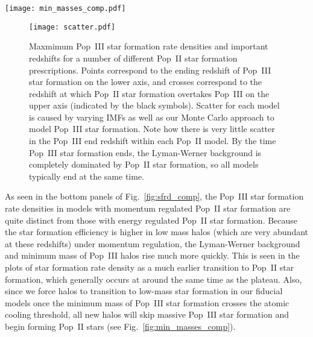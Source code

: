 \documentclass[a4paper,fleqn,usenatbib]{mnras}
\begin{document}
\begin{figure*}
	\texttt{[image: min\_masses\_comp.pdf]}
    \caption{Minimum mass for Pop~III star formation for a variety of our models. The atomic cooling threshold is shown as the dashed line. The top panel shows our results for the low mass Pop~III IMF under a variety of different assumptions for the Pop~II and III star formation prescriptions. The bottom panels compare our results for different Pop~III IMFs using the energy- and momentum- regulated Pop~II star formation prescriptions. Once the minimum mass crosses the atomic cooling threshold, any new halos will begin forming low-mass stars, even if they form out of primordial gas. This is why the Pop~III star formation rate density vanishes so quickly in the momentum regulated models.}
    \label{fig:min_masses_comp}
\end{figure*}

\begin{figure}
	\texttt{[image: scatter.pdf]}
    \caption{Maxmimum Pop~III star formation rate densities and important redshifts for a number of different Pop~II star formation prescriptions. Points correspond to the ending redshift of Pop~III star formation on the lower axis, and crosses correspond to the redshift at which Pop~II star formation overtakes Pop~III on the upper axis (indicated by the black symbols). Scatter for each model is caused by varying 
    IMFs as well as our Monte Carlo approach to model Pop~III star formation. Note how there is very little scatter in the Pop~III end redshift within each Pop~II model. By the time Pop~III star formation ends, the Lyman-Werner background is completely dominated by Pop~II star formation, so all models typically end at the same time.}
    \label{fig:scatter}
\end{figure}

As seen in the bottom panels of Fig.~\ref{fig:sfrd_comp}, the Pop~III star formation rate densities in models with momentum regulated Pop~II star formation are quite distinct from those with energy regulated Pop~II star formation. Because the star formation efficiency is higher in low mass halos (which are very abundant at these redshifts)  
under momentum regulation, the Lyman-Werner background and minimum mass of Pop~III halos rise much more quickly.  This is seen in the plots of star formation rate density as a much earlier transition to Pop~II star formation, which generally occurs at around the same time as the plateau. Also, since we force halos to transition to low-mass
star formation in our fiducial 
models once the minimum mass of Pop~III star formation crosses the atomic cooling threshold, all new halos will skip massive Pop~III star formation and begin forming Pop~II stars (see Fig.~\ref{fig:min_masses_comp}).
\end{document}
